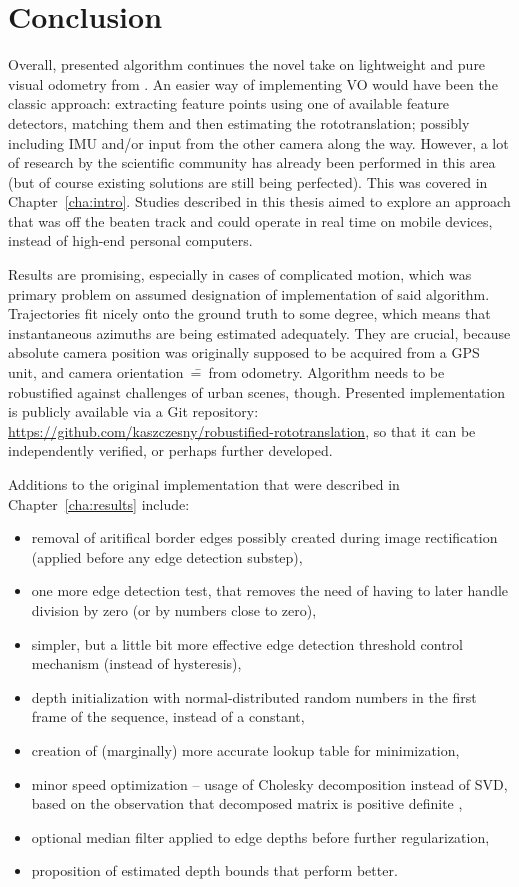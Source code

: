 \chapter{Conclusion}
\label{cha:conclusion}

Overall, presented algorithm continues the novel take on lightweight and pure visual odometry from \cite{jose2015realtime}. An easier way of implementing VO would have been the classic approach: extracting feature points using one of available feature detectors, matching them and then estimating the rototranslation; possibly including IMU and/or input from the other camera along the way. However, a lot of research by the scientific community has already been performed in this area (but of course existing solutions are still being perfected). This was covered in Chapter~\ref{cha:intro}. Studies described in this thesis aimed to explore an approach that was off the beaten track and could operate in real time on mobile devices, instead of high-end personal computers.

Results are promising, especially in cases of complicated motion, which was primary problem on assumed designation of implementation of said algorithm. Trajectories fit nicely onto the ground truth to some degree, which means that instantaneous azimuths are being estimated adequately. They are crucial, because absolute camera position was originally supposed to be acquired from a GPS unit, and camera orientation~\==~from odometry. Algorithm needs to be robustified against challenges of urban scenes, though. Presented implementation is publicly available via a Git repository: \url{https://github.com/kaszczesny/robustified-rototranslation}, so that it can be independently verified, or perhaps further developed.

Additions to the original implementation \cite{jose2015realtime} that were described in Chapter~\ref{cha:results} include:
\begin{itemize}[topsep=0.5em]
	\itemsep-0.25em
	\item removal of aritifical border edges possibly created during image rectification (applied before any edge detection substep),
	\item one more edge detection test, that removes the need of having to later handle division by zero (or by numbers close to zero),
	\item simpler, but a little bit more effective edge detection threshold control mechanism (instead of hysteresis),
	\item depth initialization with normal-distributed random numbers in the first frame of the sequence, instead of a constant,
	\item creation of (marginally) more accurate lookup table for minimization,
	\item minor speed optimization -- usage of Cholesky decomposition instead of SVD, based on the observation that decomposed matrix is positive definite \cite{madsen2004methods},
	\item optional median filter applied to edge depths before further regularization,
	\item proposition of estimated depth bounds that perform better.
\end{itemize}


